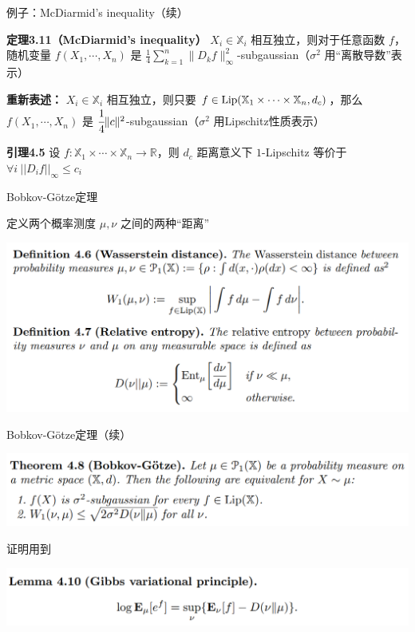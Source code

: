 \documentclass{beamer}
\begin{document}
\begin{frame}{例子：McDiarmid's inequality（续）}

\textbf{定理3.11（McDiarmid's inequality）} $X_i\in\mathbb{X}_i$ 相互独立，则对于任意函数 $f$，随机变量 $f(X_1, \cdots, X_n)$ 是 $\frac{1}{4} \sum_{k=1}^{n} \|D_k f\|_{\infty}^2$-subgaussian（$\sigma^2$ 用“离散导数”表示）

\quad

\textbf{重新表述：} $X_i\in\mathbb{X}_i$ 相互独立，则只要 $f\in{\rm Lip}(\mathbb{X}_1\times\cdots\times\mathbb{X}_n, d_c)$，那么$f(X_1, \cdots, X_n)$ 是 $\cfrac{1}{4}\|c\|^2$-subgaussian（$\sigma^2$ 用Lipschitz性质表示）

\quad

\textbf{引理4.5} 设 $f: \mathbb{X}_1\times\cdots\times\mathbb{X}_n \to \mathbb{R}$，则 $d_c$ 距离意义下 $1$-Lipschitz 等价于 $\forall i\ ||D_i f||_{\infty} \le c_i$

\end{frame}

\begin{frame}{Bobkov-G{\"o}tze定理}

定义两个概率测度 $\mu, \nu$ 之间的两种“距离”

\begin{center}
\includegraphics[width=1.0\textwidth, frame]{figures/4-6-def-4-7-def.png}
\end{center}

\end{frame}

\begin{frame}{Bobkov-G{\"o}tze定理（续）}

\begin{center}
\includegraphics[width=1.0\textwidth, frame]{figures/4-8-thm.png}
\end{center}

证明用到

\begin{center}
\includegraphics[width=1.0\textwidth, frame]{figures/4-10-lemma.png}
\end{center}

\end{frame}
\end{document}
